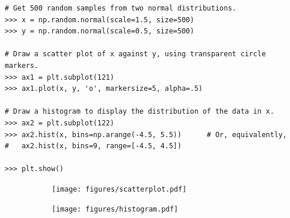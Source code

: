 \begin{lstlisting}
# Get 500 random samples from two normal distributions.
>>> x = np.random.normal(scale=1.5, size=500)
>>> y = np.random.normal(scale=0.5, size=500)

# Draw a scatter plot of x against y, using transparent circle markers.
>>> ax1 = plt.subplot(121)
>>> ax1.plot(x, y, 'o', markersize=5, alpha=.5)

# Draw a histogram to display the distribution of the data in x.
>>> ax2 = plt.subplot(122)
>>> ax2.hist(x, bins=np.arange(-4.5, 5.5))      # Or, equivalently,
#   ax2.hist(x, bins=9, range=[-4.5, 4.5])

>>> plt.show()
\end{lstlisting}

\begin{figure}[H]
\captionsetup[subfigure]{justification=centering}
\centering
\begin{framed}
\begin{subfigure}{.49\textwidth}
    \centering
    \texttt{[image: figures/scatterplot.pdf]}
\end{subfigure}
%
\begin{subfigure}{.49\textwidth}
    \centering
    \texttt{[image: figures/histogram.pdf]}
\end{subfigure}
\end{framed}
\end{figure}


